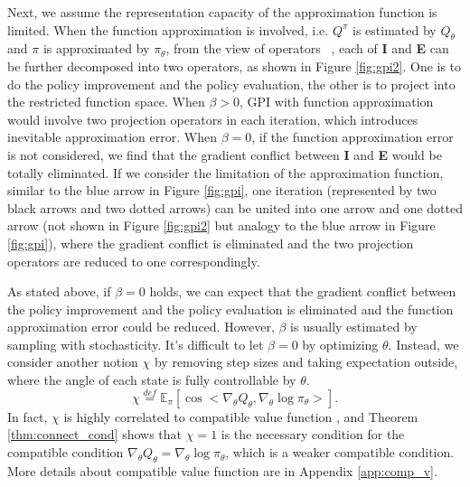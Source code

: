 
Next, we assume the representation capacity of the approximation function is limited.
When the function approximation is involved, i.e. $Q^\pi$ is estimated by $Q_\theta$ and $\pi$ is approximated by $\pi_\theta$, from the view of operators ~\citep{op_reinforce}, each of \textbf{I} and \textbf{E} can be further decomposed into two operators, as shown in Figure \ref{fig:gpi2}.
One is to do the policy improvement and the policy evaluation, the other is to project into the restricted function space.
When $\beta > 0$, GPI with function approximation would involve two projection operators in each iteration, which introduces inevitable approximation error.
When $\beta = 0$, if the function approximation error is not considered, we find that the gradient conflict between \textbf{I} and \textbf{E} would be totally eliminated.
If we consider the limitation of the approximation function, similar to the blue arrow in Figure \ref{fig:gpi}, one iteration (represented by two black arrows and two dotted arrows) can be united into one arrow and one dotted arrow (not shown in Figure \ref{fig:gpi2} but analogy to the blue arrow in Figure \ref{fig:gpi}), where the gradient conflict is eliminated and the two projection operators are reduced to one correspondingly.

As stated above, if $\beta = 0$ holds, we can expect that the gradient conflict between the policy improvement and the policy evaluation is eliminated and the function approximation error could be reduced. 
{ However, $\beta$ is usually estimated by sampling with stochasticity. 
It's difficult to let $\beta = 0$ by optimizing $\theta$. 
Instead, we consider another notion $\chi$ by removing step sizes and taking expectation outside, where the angle of each state is fully controllable by $\theta$.
\begin{equation}
    \chi \overset{def}{=} \mathbb{E}_\pi [\cos <\nabla_\theta Q_\theta, \nabla_\theta \log \pi_\theta>].
\end{equation}
In fact, $\chi$ is highly correlated to compatible value function \citep{sutton1999policy},
and Theorem \ref{thm:connect_cond} shows that $\chi = 1$ is the necessary condition for the compatible condition $\nabla_\theta Q_\theta = \nabla_\theta \log \pi_\theta$, which is a weaker compatible condition.
More details about compatible value function are in Appendix \ref{app:comp_v}.
}

